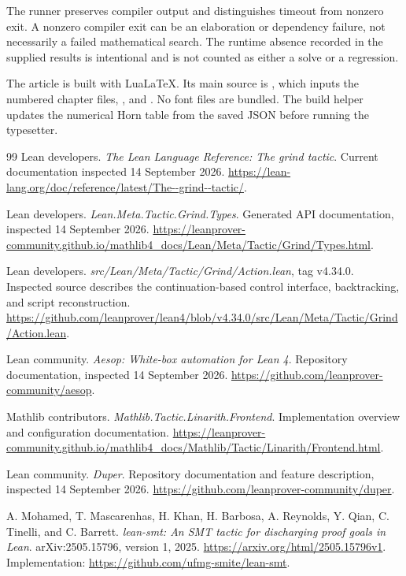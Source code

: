 \documentclass[11pt,a4paper]{article}
\begin{document}
The runner preserves compiler output and distinguishes timeout from nonzero
exit. A nonzero compiler exit can be an elaboration or dependency failure,
not necessarily a failed mathematical search. The runtime absence recorded in
the supplied results is intentional and is not counted as either a solve or
a regression.

The article is built with LuaLaTeX. Its main source is
, which inputs the numbered chapter files,
, and . No font files are bundled.
The build helper updates the numerical Horn table from the saved JSON before
running the typesetter.


\clearpage
{}
\begin{thebibliography}{99}
\small
{}
Lean developers. \emph{The Lean Language Reference: The grind tactic}.
Current documentation inspected 14 September 2026.
\url{https://lean-lang.org/doc/reference/latest/The--grind--tactic/}.

Lean developers. \emph{Lean.Meta.Tactic.Grind.Types}. Generated API
documentation, inspected 14 September 2026.
\url{https://leanprover-community.github.io/mathlib4_docs/Lean/Meta/Tactic/Grind/Types.html}.

Lean developers. \emph{src/Lean/Meta/Tactic/Grind/Action.lean}, tag v4.34.0.
Inspected source describes the continuation-based control interface,
backtracking, and script reconstruction.
\url{https://github.com/leanprover/lean4/blob/v4.34.0/src/Lean/Meta/Tactic/Grind/Action.lean}.

Lean community. \emph{Aesop: White-box automation for Lean 4}.
Repository documentation, inspected 14 September 2026.
\url{https://github.com/leanprover-community/aesop}.

Mathlib contributors. \emph{Mathlib.Tactic.Linarith.Frontend}.
Implementation overview and configuration documentation.
\url{https://leanprover-community.github.io/mathlib4_docs/Mathlib/Tactic/Linarith/Frontend.html}.

Lean community. \emph{Duper}. Repository documentation and feature description,
inspected 14 September 2026.
\url{https://github.com/leanprover-community/duper}.

A. Mohamed, T. Mascarenhas, H. Khan, H. Barbosa, A. Reynolds, Y. Qian,
C. Tinelli, and C. Barrett.
\emph{lean-smt: An SMT tactic for discharging proof goals in Lean}.
arXiv:2505.15796, version 1, 2025.
\url{https://arxiv.org/html/2505.15796v1}.
Implementation: \url{https://github.com/ufmg-smite/lean-smt}.


\end{thebibliography}
\end{document}
